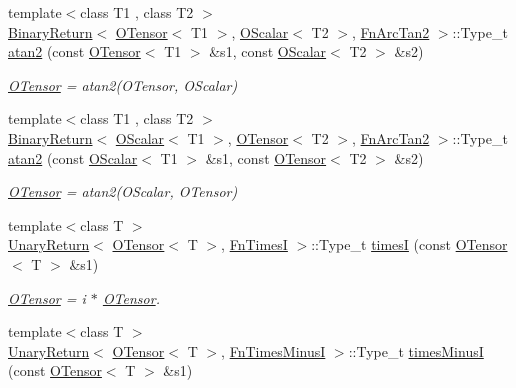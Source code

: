 \begin{DoxyCompactItemize}
{\footnotesize template$<$class T1 , class T2 $>$ }\\\mbox{\hyperlink{structENSEM_1_1BinaryReturn}{Binary\+Return}}$<$ \mbox{\hyperlink{classENSEM_1_1OTensor}{O\+Tensor}}$<$ T1 $>$, \mbox{\hyperlink{classENSEM_1_1OScalar}{O\+Scalar}}$<$ T2 $>$, \mbox{\hyperlink{structENSEM_1_1FnArcTan2}{Fn\+Arc\+Tan2}} $>$\+::Type\+\_\+t \mbox{\hyperlink{group__obstensor_gaba8ed2c3683bbcbda35e8a372d7ee2e6}{atan2}} (const \mbox{\hyperlink{classENSEM_1_1OTensor}{O\+Tensor}}$<$ T1 $>$ \&s1, const \mbox{\hyperlink{classENSEM_1_1OScalar}{O\+Scalar}}$<$ T2 $>$ \&s2)
\begin{DoxyCompactList}\small\item\em \mbox{\hyperlink{classENSEM_1_1OTensor}{O\+Tensor}} = atan2(\+O\+Tensor, O\+Scalar) \end{DoxyCompactList}\item 
{\footnotesize template$<$class T1 , class T2 $>$ }\\\mbox{\hyperlink{structENSEM_1_1BinaryReturn}{Binary\+Return}}$<$ \mbox{\hyperlink{classENSEM_1_1OScalar}{O\+Scalar}}$<$ T1 $>$, \mbox{\hyperlink{classENSEM_1_1OTensor}{O\+Tensor}}$<$ T2 $>$, \mbox{\hyperlink{structENSEM_1_1FnArcTan2}{Fn\+Arc\+Tan2}} $>$\+::Type\+\_\+t \mbox{\hyperlink{group__obstensor_ga81f7f5b4d6ba20b09ce1c6a2f7284657}{atan2}} (const \mbox{\hyperlink{classENSEM_1_1OScalar}{O\+Scalar}}$<$ T1 $>$ \&s1, const \mbox{\hyperlink{classENSEM_1_1OTensor}{O\+Tensor}}$<$ T2 $>$ \&s2)
\begin{DoxyCompactList}\small\item\em \mbox{\hyperlink{classENSEM_1_1OTensor}{O\+Tensor}} = atan2(\+O\+Scalar, O\+Tensor) \end{DoxyCompactList}\item 
{\footnotesize template$<$class T $>$ }\\\mbox{\hyperlink{structENSEM_1_1UnaryReturn}{Unary\+Return}}$<$ \mbox{\hyperlink{classENSEM_1_1OTensor}{O\+Tensor}}$<$ T $>$, \mbox{\hyperlink{structENSEM_1_1FnTimesI}{Fn\+TimesI}} $>$\+::Type\+\_\+t \mbox{\hyperlink{group__obstensor_ga014bfcb56266f5301dcc8a1fe479f8b1}{timesI}} (const \mbox{\hyperlink{classENSEM_1_1OTensor}{O\+Tensor}}$<$ T $>$ \&s1)
\begin{DoxyCompactList}\small\item\em \mbox{\hyperlink{classENSEM_1_1OTensor}{O\+Tensor}} = i $\ast$ \mbox{\hyperlink{classENSEM_1_1OTensor}{O\+Tensor}}. \end{DoxyCompactList}\item 
{\footnotesize template$<$class T $>$ }\\\mbox{\hyperlink{structENSEM_1_1UnaryReturn}{Unary\+Return}}$<$ \mbox{\hyperlink{classENSEM_1_1OTensor}{O\+Tensor}}$<$ T $>$, \mbox{\hyperlink{structENSEM_1_1FnTimesMinusI}{Fn\+Times\+MinusI}} $>$\+::Type\+\_\+t \mbox{\hyperlink{group__obstensor_ga2ff1b1b26805ce37116135e8474f4b36}{times\+MinusI}} (const \mbox{\hyperlink{classENSEM_1_1OTensor}{O\+Tensor}}$<$ T $>$ \&s1)

\end{DoxyCompactItemize}
